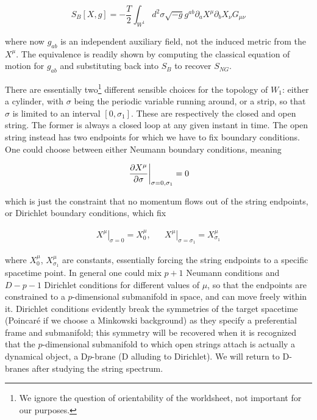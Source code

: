 \begin{equation}
	S_B\left[ X,g \right] = -\frac{T}{2} \int_{W^1} d^2\sigma \sqrt{-g} g^{ab} \partial_a X^\mu \partial_b X_\nu G_{\mu\nu}
\end{equation}


where now $g_{ab}$ is an independent auxiliary field, not the induced metric from the $X^\mu$. The equivalence is readily shown by computing the classical equation of motion for $g_{ab}$ and substituting back into $S_B$ to recover $S_{NG}$.


There are essentially two\footnote{We ignore the question of orientability of the worldsheet, not important for our purposes.} different sensible choices for the topology of $W_1$: either a cylinder, with $\sigma$ being the periodic variable running around, or a strip, so that $\sigma$ is limited to an interval $[0,\sigma_1]$. These are respectively the closed and open string. The former is always a closed loop at any given instant in time. The open string instead has two endpoints for which we have to fix boundary conditions.  One could choose between either Neumann boundary conditions, meaning

\begin{equation}
	\left. \frac{\partial X^\mu}{\partial\sigma}\right|_{\sigma = 0,\sigma_1} = 0
	\label{}
\end{equation}

which is just the constraint that no momentum flows out of the string endpoints, or Dirichlet boundary conditions, which fix 

\begin{align}
	\left. X^\mu \right|_{\sigma=0} = X_0^\mu, && \left. X^\mu \right|_{\sigma=\sigma_1} = X^\mu_{\sigma_1}
	\label{}
\end{align}

where $X^\mu_0$, $X^\mu_{\sigma_1}$ are constants, essentially forcing the string endpoints to a specific spacetime point. In general one could mix $p+1$ Neumann conditions and $D-p-1$ Dirichlet conditions for different values of $\mu$, so that the endpoints are constrained to a $p$-dimensional submanifold in space, and can move freely within it. Dirichlet conditions evidently break the symmetries of the target spacetime (Poincar\'e if we choose a Minkowski background) as they specify a preferential frame and submanifold; this symmetry will be recovered when it is recognized that the $p$-dimensional submanifold to which open strings attach is actually a dynamical object, a D$p$-brane (D alluding to Dirichlet). We will return to D-branes after studying the string spectrum.

